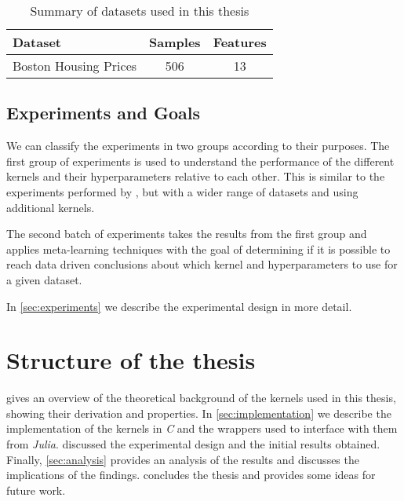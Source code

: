 \begin{table}[H]
	\caption{Summary of datasets used in this thesis}
	\label{tab:datasets}
	\begin{tabular}{lcc}
		\toprule
		Dataset               & Samples & Features \\
		\midrule
		Boston Housing Prices & 506     & 13       \\
		\bottomrule
	\end{tabular}
\end{table}

\subsection{Experiments and Goals}%

We can classify the experiments in two groups according to their purposes. The
first group of experiments is used to understand the performance of the
different kernels and their hyperparameters relative to each other. This is
similar to the experiments performed by
\textcite{frenayParameterinsensitiveKernelExtreme2011}, but with a wider range
of datasets and using additional kernels.

The second batch of experiments takes the results from the first group and
applies meta-learning techniques with the goal of determining if it is possible
to reach data driven conclusions about which kernel and hyperparameters to use
for a given dataset.

In \cref{sec:experiments} we describe the experimental design in more detail.



\section{Structure of the thesis}

 gives an overview of the theoretical
background of the kernels used in this thesis, showing their derivation and
properties. In \cref{sec:implementation} we describe the implementation of the
kernels in \emph{C} and the wrappers used to interface with them from
\emph{Julia}.  discussed the experimental design and the
initial results obtained. Finally, \cref{sec:analysis} provides an analysis of
the results and discusses the implications of the findings.
 concludes the thesis and provides some ideas for future
work.

